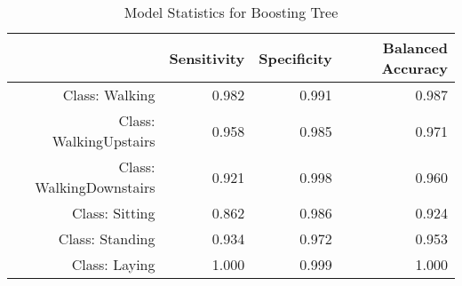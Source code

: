 \begin{table}[ht]
\centering
\caption{Model Statistics for Boosting Tree} 
\label{tab:conmat_stats_boost}
\begin{tabular}{rrrr}
  \hline
 & Sensitivity & Specificity & Balanced Accuracy \\ 
  \hline
Class: Walking & 0.982 & 0.991 & 0.987 \\ 
  Class: WalkingUpstairs & 0.958 & 0.985 & 0.971 \\ 
  Class: WalkingDownstairs & 0.921 & 0.998 & 0.960 \\ 
  Class: Sitting & 0.862 & 0.986 & 0.924 \\ 
  Class: Standing & 0.934 & 0.972 & 0.953 \\ 
  Class: Laying & 1.000 & 0.999 & 1.000 \\ 
   \hline
\end{tabular}
\end{table}
